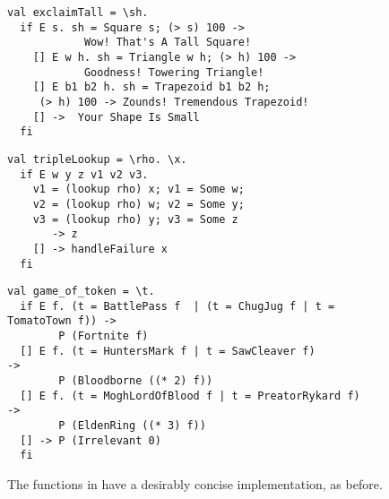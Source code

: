 \documentclass[manuscript,screen,review, 12pt, nonacm]{acmart}
\begin{document}
    
    \begin{figure}[ht] 
      \begin{minipage}[h]{0.54\linewidth}
        \vmlst 
        \begin{lstlisting}[numbers=none, basicstyle=\tiny, xleftmargin=.2em,
          showstringspaces=false,
          frame=single]
val exclaimTall = \sh.
  if E s. sh = Square s; (> s) 100 -> 
            Wow! That's A Tall Square!  
    [] E w h. sh = Triangle w h; (> h) 100 ->
            Goodness! Towering Triangle!
    [] E b1 b2 h. sh = Trapezoid b1 b2 h; 
     (> h) 100 -> Zounds! Tremendous Trapezoid!
    [] ->  Your Shape Is Small
  fi 
  \end{lstlisting}
          \label{fig:vmexclaimtall} 
      \end{minipage}%
      \begin{minipage}[h]{0.5\linewidth}
        \vmlst 
        \begin{lstlisting}[numbers=none, basicstyle=\tiny, xleftmargin=2em,
                      frame=single]
val tripleLookup = \rho. \x.
  if E w y z v1 v2 v3. 
    v1 = (lookup rho) x; v1 = Some w; 
    v2 = (lookup rho) w; v2 = Some y; 
    v3 = (lookup rho) y; v3 = Some z 
       -> z 
    [] -> handleFailure x
  fi 
   \end{lstlisting}
            \label{fig:vmtriplelookup} 
        \vspace{4ex}
      \end{minipage} 
      \begin{minipage}[h]{\linewidth}
        \vmlst 
        \begin{lstlisting}[numbers=none, basicstyle=\tiny, xleftmargin=9em,
          showstringspaces=false,
          frame=single]
val game_of_token = \t. 
  if E f. (t = BattlePass f  | (t = ChugJug f | t = TomatoTown f)) -> 
        P (Fortnite f)
  [] E f. (t = HuntersMark f | t = SawCleaver f)                   -> 
        P (Bloodborne ((* 2) f))
  [] E f. (t = MoghLordOfBlood f | t = PreatorRykard f)            -> 
        P (EldenRing ((* 3) f))
  [] -> P (Irrelevant 0)
  fi 
\end{lstlisting}
          \label{fig:vmgot}
      \vspace{4ex}
      \end{minipage}%
      \caption{The functions in \VMinus have a desirably concise
      implementation, as before.}
  \label{fig:vminusfuncs}
    \end{figure}   
\end{document}
